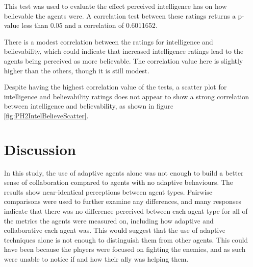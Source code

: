 \documentclass{IEEEtran}
\begin{document}
This test was used to evaluate the effect perceived intelligence has on how believable the agents were. A correlation test between these ratings returns a p-value less than 0.05 and a correlation of 0.6011652.

There is a modest correlation between the ratings for intelligence and believability, which could indicate that increased intelligence ratings lead to the agents being perceived as more believable. The correlation value here is slightly higher than the others, though it is still modest.

Despite having the highest correlation value of the tests, a scatter plot for intelligence and believability ratings does not appear to show a strong correlation between intelligence and believability, as shown in figure \ref{fig:PH2IntelBelieveScatter}.

\section{Discussion}
\label{Discussion}

In this study, the use of adaptive agents alone was not enough to build a better sense of collaboration compared to agents with no adaptive behaviours. The results show near-identical perceptions between agent types. Pairwise comparisons were used to further examine any differences, and many responses indicate that there was no difference perceived between each agent type for all of the metrics the agents were measured on, including how adaptive and collaborative each agent was. This would suggest that the use of adaptive techniques alone is not enough to distinguish them from other agents. This could have been because the players were focused on fighting the enemies, and as such were unable to notice if and how their ally was helping them.
\end{document}
